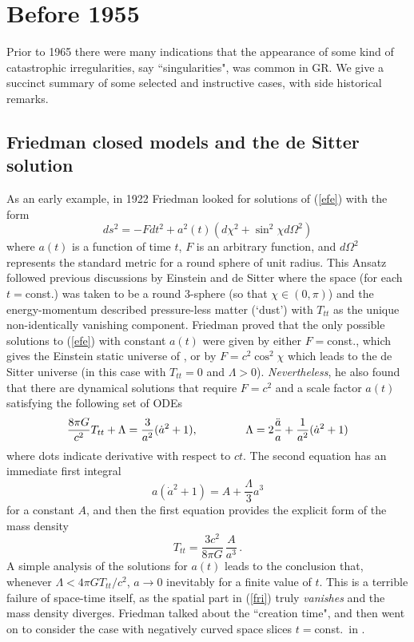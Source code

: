 \documentclass[12pt]{iopart}
\def\be{\begin{equation}}
\def\ee{\end{equation}}
\begin{document}
\section{Before 1955}\label{sec:prehistory}
Prior to 1965 there were many indications that the appearance of some kind of catastrophic  irregularities, say  ``singularities", was common in GR. We give a succinct summary of some selected and instructive cases, with side historical remarks.
\subsection{Friedman closed models and the de Sitter solution}
As an early example, in 1922 Friedman \cite{Fri} looked for solutions of (\ref{efe}) with the form
\be
ds^2 = -F dt^2 + a^2(t)\left(d\chi^2+\sin^2 \chi d\Omega^2\right) \label{fri}
\ee
where $a(t)$ is a function of time $t$, $F$ is an arbitrary function, and $d\Omega^2$ represents the standard metric for a round sphere of unit radius. This Ansatz followed previous discussions by Einstein and de Sitter \cite{E0,dS} where the space (for each $t=$const.) was taken to be a round 3-sphere (so that $\chi\in (0,\pi)$) and the energy-momentum described pressure-less matter (`dust') with $T_{tt}$ as the unique non-identically vanishing component. Friedman proved that the only possible solutions to (\ref{efe}) with constant $a(t)$ were given by either $F=$const., which gives the Einstein static universe of \cite{E0}, or by $F=c^2 \cos^2\chi$ which leads to the de Sitter universe \cite{dS,dS1} (in this case with $T_{tt}=0$ and $\Lambda >0$). {\it Nevertheless}, he also found that there are dynamical solutions that require $F=c^2$ and a scale factor $a(t)$ satisfying the following set of ODEs
$$
\frac{8\pi G}{c^2}T_{tt} +\Lambda 
=\frac{3}{a^2}(\dot{a}^2+1),\hspace{15mm} 
\Lambda=2\frac{\ddot a}{a}+\frac{1}{a^2}(\dot{a}^2+1)
$$
where dots indicate derivative with respect to $ct$. The second equation has an immediate first integral
$$
a(\dot{a}^2+1)=A+\frac{\Lambda}{3}a^3
$$
for a constant $A$, and then the first equation provides the explicit form of the mass density 
$$
T_{tt} =\frac{3c^2}{8\pi G}\, \frac{A}{a^3}\, .
$$
A simple analysis of the solutions for $a(t)$ leads to the conclusion that, whenever 
$\Lambda <4\pi GT_{tt}/c^2$, $a\rightarrow 0$ inevitably for a finite value of $t$. This is a terrible failure of space-time itself, as the spatial part in (\ref{fri}) truly {\it vanishes} and the mass density diverges. Friedman talked about the ``creation time", and then went on to consider the case with negatively curved space slices $t=$const.\ in \cite{Fri2}.
\end{document}
